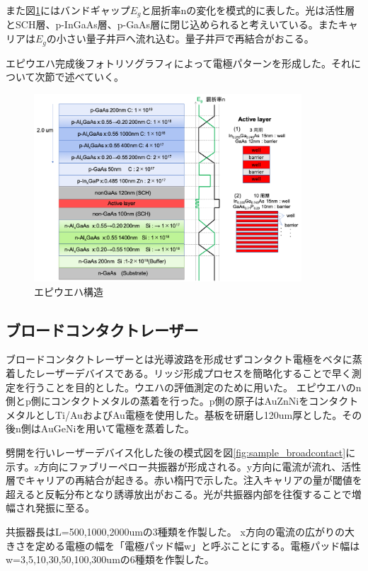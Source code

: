 また図\ref{fig:fig_2_1_wafer_structure}にはバンドギャップ$E_{g}$と屈折率nの変化を模式的に表した。光は活性層とSCH層、p-InGaAs層、p-GaAs層に閉じ込められると考えいている。またキャリアは$E_{g}$の小さい量子井戸へ流れ込む。量子井戸で再結合がおこる。

エピウエハ完成後フォトリソグラフィによって電極パターンを形成した。それについて次節で述べていく。
\begin{figure}[h]
	\centering
	\includegraphics[width=10cm]{figure/fig_2_1_wafer_structure}
	\caption{エピウエハ構造}
	\label{fig:fig_2_1_wafer_structure}
\end{figure}
\subsection{ブロードコンタクトレーザー}%
ブロードコンタクトレーザーとは光導波路を形成せずコンタクト電極をベタに蒸着したレーザーデバイスである。リッジ形成プロセスを簡略化することで早く測定を行うことを目的とした。ウエハの評価測定のために用いた。
エピウエハのn側とp側にコンタクトメタルの蒸着を行った。p側の原子はAuZnNiをコンタクトメタルとしTi/AuおよびAu電極を使用した。基板を研磨し120um厚とした。その後n側はAuGeNiを用いて電極を蒸着した。


劈開を行いレーザーデバイス化した後の模式図を図\ref{fig:sample_broadcontact}に示す。z方向にファブリーペロー共振器が形成される。y方向に電流が流れ、活性層でキャリアの再結合が起きる。赤い楕円で示した。注入キャリアの量が閾値を超えると反転分布となり誘導放出がおこる。光が共振器内部を往復することで増幅され発振に至る。

共振器長はL=500,1000,2000umの3種類を作製した。
x方向の電流の広がりの大きさを定める電極の幅を「電極パッド幅w」と呼ぶことにする。電極パッド幅はw=3,5,10,30,50,100,300umの6種類を作製した。

